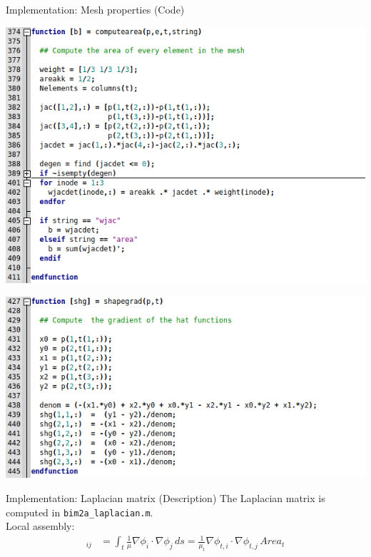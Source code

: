 \documentclass[aspectratio=54,xcolor=dvipsnames]{beamer}
\begin{document}
\begin{frame}{Implementation: Mesh properties (Code)}
    \begin{center}
        \begin{minipage}{0.58\textwidth}
            \centering
            \includegraphics[width=\textwidth]{Images/msh_area.png}
        \end{minipage}\hfill
        \begin{minipage}{0.58\textwidth}
            \centering
            \includegraphics[width=\textwidth]{Images/msh_gradient.png}
        \end{minipage}
    \end{center}
\end{frame}

\begin{frame}{Implementation: Laplacian matrix (Description)}
    The Laplacian matrix is computed in \texttt{bim2a\_laplacian.m}. \\
    Local assembly:
    \begin{align*}
        [L^{loc}]_{ij} &= \int_{t} \frac{1}{\mu} \nabla \phi_i \cdot \nabla \phi_j \, ds = \frac{1}{\mu_t} \nabla \phi_{t,i} \cdot \nabla \phi_{t,j} \, Area_t
    \end{align*}
    
\end{frame}
\end{document}
